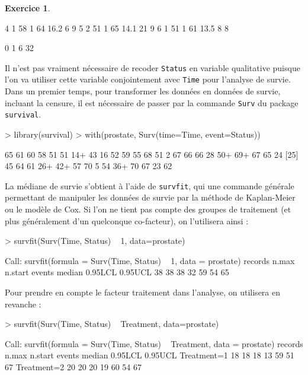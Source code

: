 \documentclass[11pt]{report}
\theoremstyle{definition}
\newtheorem{exo}{Exercice}[chapter]
\begin{document}
\begin{exo}
\begin{sol}
\begin{Schunk}
\begin{Soutput}
4         1   58      1  64 16.2    6       9
5         2   51      1  65 14.1   21       9
6         1   51      1  61 13.5    8       8
\end{Soutput}
\begin{Soutput}
 0  1 
 6 32 
\end{Soutput}
\end{Schunk}
Il n'est pas vraiment nécessaire de recoder \texttt{Status} en variable
qualitative puisque l'on va utiliser cette variable conjointement avec
\texttt{Time} pour l'analyse de survie. Dans un premier temps, pour
transformer les données en données de survie, incluant la censure, il est
nécessaire de passer par la commande \texttt{Surv} du package \texttt{survival}.
\begin{Schunk}
\begin{Sinput}
> library(survival)
> with(prostate, Surv(time=Time, event=Status))
\end{Sinput}
\begin{Soutput}
 [1] 65  61  60  58  51  51  14+ 43  16  52  59  55  68  51   2  67  66  66  28  50+ 69+ 67  65  24 
[25] 45  64  61  26+ 42+ 57  70   5  54  36+ 70  67  23  62 
\end{Soutput}
\end{Schunk}

La médiane de survie s'obtient à l'aide de \texttt{survfit}, qui une
commande générale permettant de manipuler les données de survie par la
méthode de Kaplan-Meier ou le modèle de Cox. Si l'on ne tient pas compte des
groupes de traitement (et plus généralement d'un quelconque co-facteur), on
l'utilisera ainsi : 
\begin{Schunk}
\begin{Sinput}
> survfit(Surv(Time, Status) ~ 1, data=prostate)
\end{Sinput}
\begin{Soutput}
Call: survfit(formula = Surv(Time, Status) ~ 1, data = prostate)
records   n.max n.start  events  median 0.95LCL 0.95UCL 
     38      38      38      32      59      54      65 
\end{Soutput}
\end{Schunk}

Pour prendre en compte le facteur traitement dans l'analyse, on utilisera en
revanche : 
\begin{Schunk}
\begin{Sinput}
> survfit(Surv(Time, Status) ~ Treatment, data=prostate)
\end{Sinput}
\begin{Soutput}
Call: survfit(formula = Surv(Time, Status) ~ Treatment, data = prostate)
            records n.max n.start events median 0.95LCL 0.95UCL
Treatment=1      18    18      18     13     59      51      67
Treatment=2      20    20      20     19     60      54      67
\end{Soutput}
\end{Schunk}


\end{sol}
\end{exo}
\end{document}
